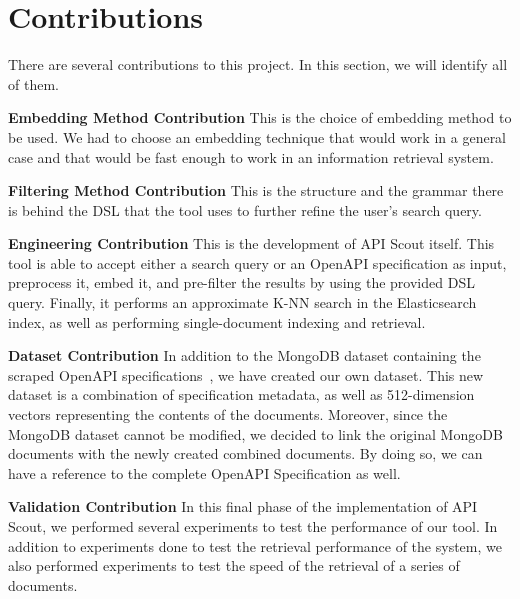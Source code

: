 \section{Contributions}\label{sec:contributions}
There are several contributions to this project.
In this section, we will identify all of them.

\begin{description}
    \item \textbf{Embedding Method Contribution} This is the choice of embedding method to be used.
    We had to choose an embedding technique that would work in a general case and that would be fast enough to work in an information retrieval system.
    \item \textbf{Filtering Method Contribution} This is the structure and the grammar there is behind the DSL that the tool uses to further refine the user's search query.
    \item \textbf{Engineering Contribution} This is the development of API Scout itself.
    This tool is able to accept either a search query or an OpenAPI specification as input, preprocess it, embed it, and pre-filter the results by using the provided DSL query.
    Finally, it performs an approximate K-NN search in the Elasticsearch index, as well as performing single-document indexing and retrieval.
    \item \textbf{Dataset Contribution} In addition to the MongoDB dataset
    containing the scraped OpenAPI specifications~\cite{souhaila_serbout_apistic_2024}, we have created our own dataset.
    This new dataset is a combination of specification metadata, as well as 512-dimension vectors representing the contents of the documents.
    Moreover, since the MongoDB dataset cannot be modified, we decided to link the original MongoDB documents with the newly created combined documents.
    By doing so, we can have a reference to the complete OpenAPI Specification as well.
    \item \textbf{Validation Contribution} In this final phase of the implementation of API Scout, we performed several experiments to test the performance of our tool.
    In addition to experiments done to test the retrieval performance of the system, we also performed experiments to test the speed of the retrieval of a series of documents.
\end{description}

